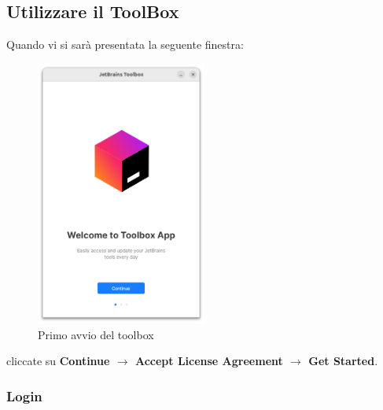     \subsection{Utilizzare il ToolBox}
        Quando vi si sarà presentata la seguente finestra:
        \begin{figure}[H]
            \centering
            \graphicspath{{src/capitoli/04/img/}}
            \includegraphics[width=0.5\textwidth]{toolbox-primo-avvio.png}
            \caption{Primo avvio del toolbox}
            \label{fig:Primo avvio del toolbox}
        \end{figure}
        cliccate su \textbf{Continue $\rightarrow$ Accept License Agreement $\rightarrow$ Get Started}.
        \subsubsection{Login}

